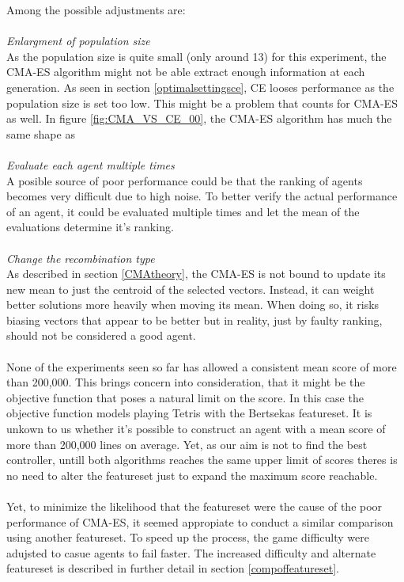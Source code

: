 Among the possible adjustments are:\\
\\
\textit{Enlargment of population size}\\
As the population size is quite small (only around 13)
for this experiment, the CMA-ES algorithm might not be able
extract enough information at each generation. As seen in 
section \ref{optimalsettingsce}, CE looses performance as 
the population size is set too low. This might be a problem 
that counts for CMA-ES as well. In figure \ref{fig:CMA_VS_CE_00},
the CMA-ES algorithm has much the same shape as \\
\\
\textit{Evaluate each agent multiple times}\\
A posible source of poor performance could be 
that the ranking of agents becomes very difficult
due to high noise. To better verify the actual
performance of an agent, it could be evaluated 
multiple times and let the mean of the evaluations
determine it's ranking.\\
\\
\textit{Change the recombination type}\\
As described in section \ref{CMAtheory}, 
the CMA-ES is not bound to update its 
new mean to just the centroid of the selected 
vectors. Instead, it can weight better solutions
more heavily when moving its mean. When doing so,
it risks biasing vectors that appear to be better 
but in reality, just by faulty ranking, should
not be considered a good agent.\\
\\
None of the experiments seen so far has allowed a 
consistent mean score of more 
than 200,000. This brings concern into 
consideration, that it might be the objective function
that poses a natural limit on the score.
In this case the objective function
models playing Tetris with the Bertsekas featureset. 
It is unkown to us
whether it's possible to construct an agent 
with a mean score of more than
200,000 lines on average. 
Yet, as our aim is not to find the best controller,
untill both algorithms reaches the same upper limit 
of scores theres is no need
to alter the featureset just to
expand the maximum score reachable.\\
\\
Yet, to minimize the likelihood 
that the featureset were the cause of the 
poor performance of CMA-ES, it seemed 
appropiate to conduct a similar comparison 
using another featureset. 
To speed up the process, the game difficulty were 
adujsted to casue agents to fail faster.
The increased difficulty and alternate
featureset is described in 
further detail in section \ref{compoffeatureset}.

